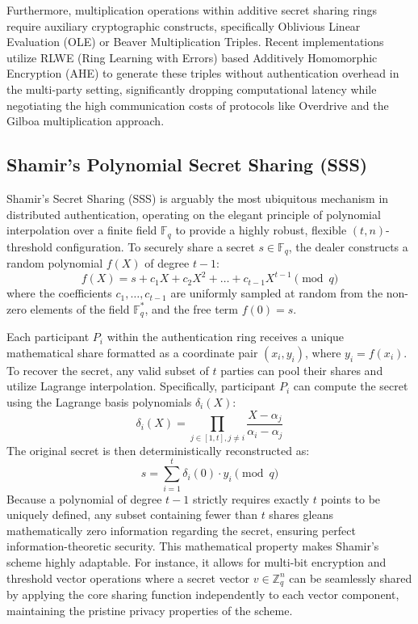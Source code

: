\documentclass[11pt, a4paper]{article}
\begin{document}
Furthermore, multiplication operations within additive secret sharing rings require auxiliary cryptographic constructs, specifically Oblivious Linear Evaluation (OLE) or Beaver Multiplication Triples. Recent implementations utilize RLWE (Ring Learning with Errors) based Additively Homomorphic Encryption (AHE) to generate these triples without authentication overhead in the multi-party setting, significantly dropping computational latency while negotiating the high communication costs of protocols like Overdrive and the Gilboa multiplication approach.

\subsection*{Shamir's Polynomial Secret Sharing (SSS)}
Shamir’s Secret Sharing (SSS) is arguably the most ubiquitous mechanism in distributed authentication, operating on the elegant principle of polynomial interpolation over a finite field $\mathbb{F}_q$ to provide a highly robust, flexible $(t, n)$-threshold configuration. To securely share a secret $s \in \mathbb{F}_q$, the dealer constructs a random polynomial $f(X)$ of degree $t-1$:
\[ f(X) = s + c_1 X + c_2 X^2 + \dots + c_{t-1} X^{t-1} \pmod q \]
where the coefficients $c_1, \dots, c_{t-1}$ are uniformly sampled at random from the non-zero elements of the field $\mathbb{F}_q^*$, and the free term $f(0) = s$.

Each participant $P_i$ within the authentication ring receives a unique mathematical share formatted as a coordinate pair $(x_i, y_i)$, where $y_i = f(x_i)$. To recover the secret, any valid subset of $t$ parties can pool their shares and utilize Lagrange interpolation. Specifically, participant $P_i$ can compute the secret using the Lagrange basis polynomials $\delta_i(X)$:
\[ \delta_i(X) = \prod_{j \in [1, t], j \neq i} \frac{X - \alpha_j}{\alpha_i - \alpha_j} \]
The original secret is then deterministically reconstructed as:
\[ s = \sum_{i=1}^t \delta_i(0) \cdot y_i \pmod q \]
Because a polynomial of degree $t-1$ strictly requires exactly $t$ points to be uniquely defined, any subset containing fewer than $t$ shares gleans mathematically zero information regarding the secret, ensuring perfect information-theoretic security. This mathematical property makes Shamir's scheme highly adaptable. For instance, it allows for multi-bit encryption and threshold vector operations where a secret vector $v \in \mathbb{Z}_q^n$ can be seamlessly shared by applying the core sharing function independently to each vector component, maintaining the pristine privacy properties of the scheme.
\end{document}
